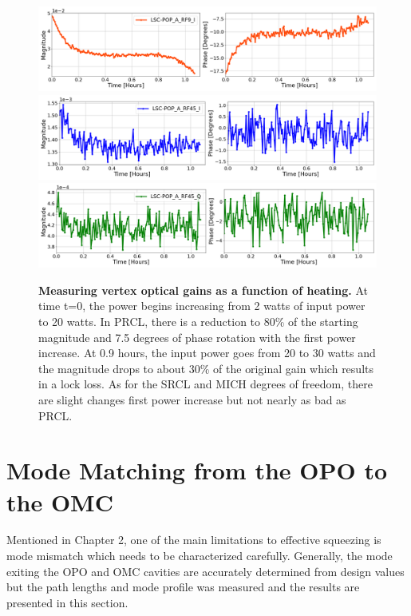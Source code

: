 	\begin{figure}[t!]
		\centering
		\includegraphics[width=1.0 \textwidth]{../Figures/PRCL_EXC_LSC-POP_A_RF9_I.png}
		\includegraphics[width=1.0 \textwidth]{../Figures/SRCL_EXC_LSC-POP_A_RF45_I.png}
		\includegraphics[width=1.0 \textwidth]{../Figures/MICH_EXC_LSC-POP_A_RF45_Q.png}
		\caption[Measuring vertex optical gains as a function of heating.]  
		{\textbf{Measuring vertex optical gains as a function of heating.}
		At time t=0, the power begins increasing from 2 watts of input power to 20 watts. In PRCL, there is a reduction to 80\% of the starting magnitude and 7.5 degrees of phase rotation with the first power increase. At 0.9 hours, the input power goes from 20 to 30 watts and the magnitude drops to about 30\% of the original gain which results in a lock loss.  As for the SRCL and MICH degrees of freedom, there are slight changes first power increase but not nearly as bad as PRCL.
		}
		\label{fig:POP18_POP90}
	\end{figure}

\clearpage

\section{Mode Matching from the OPO to the OMC}
	Mentioned in Chapter 2, one of the main limitations to effective squeezing is mode mismatch which needs to be characterized carefully.  Generally, the mode exiting the OPO and OMC cavities are accurately determined from design values but the path lengths and mode profile was measured and the results are presented in this section.
	
